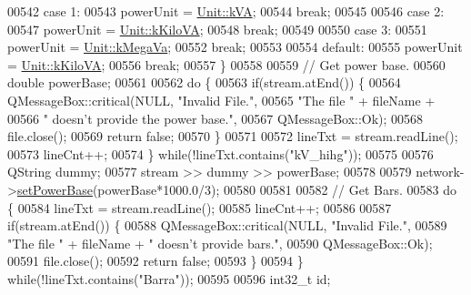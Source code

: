 \begin{DoxyCode}
00542   \textcolor{keywordflow}{case} 1:
00543     powerUnit = \hyperlink{class_unit_ace265ae255370ccacfd5370337572c3ba72b181a842ae2759488a2fa1410d3696}{Unit::kVA};
00544     \textcolor{keywordflow}{break};
00545 
00546   \textcolor{keywordflow}{case} 2:
00547     powerUnit = \hyperlink{class_unit_ace265ae255370ccacfd5370337572c3bac9e5154522fbb810d7aed75c3ff47cb2}{Unit::kKiloVA};
00548     \textcolor{keywordflow}{break};
00549 
00550   \textcolor{keywordflow}{case} 3:
00551     powerUnit = \hyperlink{class_unit_ace265ae255370ccacfd5370337572c3ba6039da0ed20f8bee64305bab8bdec365}{Unit::kMegaVa};
00552     \textcolor{keywordflow}{break};
00553 
00554   \textcolor{keywordflow}{default}:
00555     powerUnit = \hyperlink{class_unit_ace265ae255370ccacfd5370337572c3bac9e5154522fbb810d7aed75c3ff47cb2}{Unit::kKiloVA};
00556     \textcolor{keywordflow}{break};
00557   \}
00558 
00559   \textcolor{comment}{// Get power base.}
00560   \textcolor{keywordtype}{double} powerBase;
00561 
00562   \textcolor{keywordflow}{do} \{
00563     \textcolor{keywordflow}{if}(stream.atEnd()) \{
00564       QMessageBox::critical(NULL, \textcolor{stringliteral}{"Invalid File."},
00565                             \textcolor{stringliteral}{"The file "} + fileName +
00566                             \textcolor{stringliteral}{" doesn't provide the power base."},
00567                             QMessageBox::Ok);
00568       file.close();
00569       \textcolor{keywordflow}{return} \textcolor{keyword}{false};
00570     \}
00571 
00572     lineTxt = stream.readLine();
00573     lineCnt++;
00574   \} \textcolor{keywordflow}{while}(!lineTxt.contains(\textcolor{stringliteral}{"kV\_hihg"}));
00575 
00576   QString dummy;
00577   stream >> dummy >> powerBase;
00578 
00579   network->\hyperlink{group___models_ga3ba9ef05ea0c5037a415cfab25d03a0d}{setPowerBase}(powerBase*1000.0/3);
00580 
00581 
00582   \textcolor{comment}{// Get Bars.}
00583   \textcolor{keywordflow}{do} \{
00584     lineTxt = stream.readLine();
00585     lineCnt++;
00586 
00587     \textcolor{keywordflow}{if}(stream.atEnd()) \{
00588       QMessageBox::critical(NULL, \textcolor{stringliteral}{"Invalid File."},
00589                             \textcolor{stringliteral}{"The file "} + fileName + \textcolor{stringliteral}{" doesn't provide bars."},
00590                             QMessageBox::Ok);
00591       file.close();
00592       \textcolor{keywordflow}{return} \textcolor{keyword}{false};
00593     \}
00594   \} \textcolor{keywordflow}{while}(!lineTxt.contains(\textcolor{stringliteral}{"Barra"}));
00595 
00596   int32\_t id;

\end{DoxyCode}
